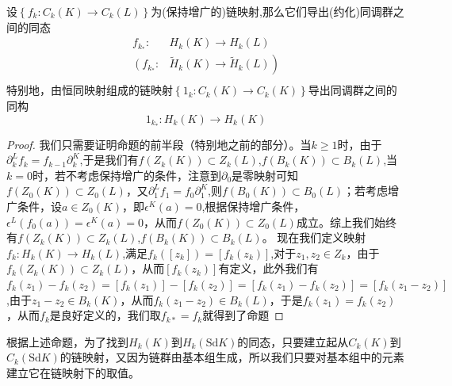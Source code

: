 \begin{proposition}\label{pro1489}
设$\left\{f_{k}:C_{k}(K)\rightarrow C_{k}(L)\right\}$为(保持增广的)链映射,那么它们导出(约化)同调群之间的同态
\begin{equation*}
\begin{aligned}
     f_{k_{*}}:& H_{k}(K)\rightarrow H_{k}(L)\\
    \left(\right.f_{k_{*}}:& \tilde{H}_{k}(K)\rightarrow \tilde{H}_{k}(L)\left.\right)  \\
\end{aligned}
\end{equation*}
特别地，由恒同映射组成的链映射$\left\{1_{k}:C_{k}(K)\rightarrow C_{k}(K)\right\}$导出同调群之间的同构
\begin{equation*}
    1_{k_{*}}:H_{k}(K)\rightarrow H_{k}(K)
\end{equation*}
\end{proposition}
\begin{proof}
我们只需要证明命题的前半段（特别地之前的部分）。当$k\geq 1$时，由于$\partial_{k}^{L}f_{k}=f_{k-1}\partial_{k}^{K}$,于是我们有$f(Z_{k}(K))\subset Z_{k}(L)$,$f(B_{k}(K))\subset B_{k}(L)$,当$k=0$时，若不考虑保持增广的条件，注意到$\partial_{0}$是零映射可知$f(Z_{0}(K))\subset Z_{0}(L)$，又$\partial_{1}^{L}f_{1}=f_{0}\partial_{1}^{K}$,则$f(B_{0}(K))\subset B_{0}(L)$；若考虑增广条件，设$a\in Z_{0}(K)$，即$\epsilon^{K}(a)=0$,根据保持增广条件，$\epsilon^{L}(f_{0}(a))=\epsilon^{K}(a)=0$，从而$f(Z_{0}(K))\subset Z_{0}(L)$成立。综上我们始终有$f(Z_{k}(K))\subset Z_{k}(L)$,$f(B_{k}(K))\subset B_{k}(L)$。
现在我们定义映射$f_{k}:H_{k}(K)\rightarrow H_{k}(L)$,满足$f_{k}([z_{k}])=[f_{k}(z_{k})]$,对于$z_{1},z_{2}\in Z_{k}$，由于$f_{k}(Z_{k}(K))\subset Z_{k}(L)$，从而$[f_{k}(z_{k})]$有定义，此外我们有$f_{k}(z_{1})-f_{k}(z_{2})=[f_{k}(z_{1})]-[f_{k}(z_{2})]=[f_{k}(z_{1})-f_{k}(z_{2})]=[f_{k}(z_{1}-z_{2})]$,由于$z_{1}-z_{2}\in B_{k}(K)$，从而$f_{k}(z_{1}-z_{2})\in B_{k}(L)$，于是$f_{k}(z_{1})=f_{k}(z_{2})$，从而$f_{k}$是良好定义的，我们取$f_{k*}=f_{k}$就得到了命题
\end{proof}
根据上述命题，为了找到$H_{k}(K)$到$H_{k}(\text{Sd}K)$的同态，只要建立起从$C_{k}(K)$到$C_{k}(\text{Sd}K)$的链映射，又因为链群由基本组生成，所以我们只要对基本组中的元素建立它在链映射下的取值。

